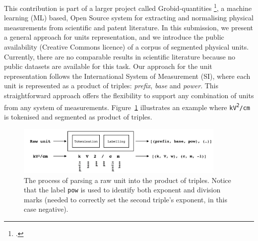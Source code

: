 \documentclass[a4paper,11pt]{article}
\begin{document}
This contribution is part of a larger project called Grobid-quantities \footcite{grobid-quantities}, a machine learning (ML) based, Open Source system for extracting and normalising physical measurements from scientific and patent literature. 
In this submission, we present a general approach for units representation, and we introduce the public availability (Creative Commons licence) of a corpus of segmented physical units. 
Currently, there are no comparable results in scientific literature because no public datasets are available for this task.
Our approach for the unit representation follows the International System of Measurement (SI), where each unit is represented as a product of triples: \textit{prefix}, \textit{base} and \textit{power}. This straightforward approach offers the flexibility to support any combination of units from any system of measurements. 
Figure~\ref{fig:dataset example} illustrates an example where \texttt{kV\textsuperscript{2}/cm} is tokenised and segmented as product of triples.
\begin{figure}[h]
    \centering
    \includegraphics[width=0.9\textwidth,natwidth=527,natheight=124]{system-schema.png}
    \caption[] {The process of parsing a raw unit into the product of triples. Notice that the label \texttt{pow} is used to identify both exponent and division marks (needed to correctly set the second triple's exponent, in this case negative).}
    \label{fig:dataset example}
\end{figure}
\end{document}
